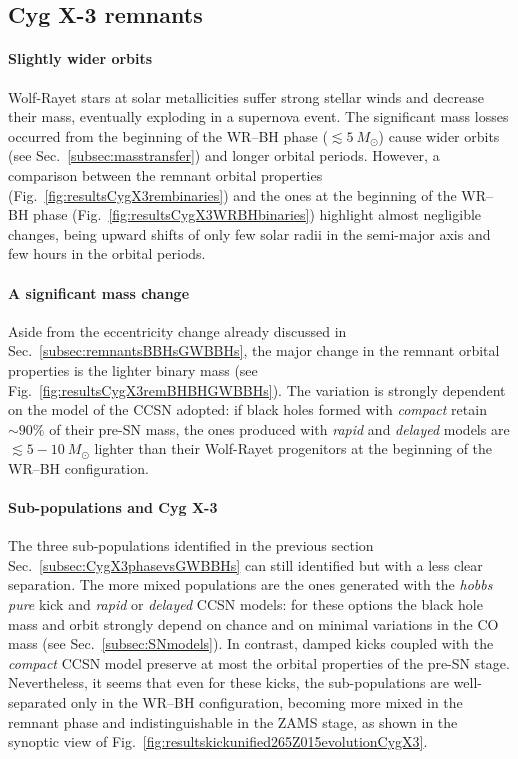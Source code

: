 \documentclass[a4paper,titlepage]{book}     	%
\newcommand{\sun}{\ensuremath{_\odot}}
\newcommand{\msun}{\ensuremath{M\sun}}
\begin{document}
\subsection{Cyg X-3 remnants}\label{subsec:RemnantsCygX3vsGWBBHs}
\paragraph{Slightly wider orbits} Wolf-Rayet stars at solar metallicities suffer strong stellar winds and decrease their mass, eventually exploding in a supernova event. The significant mass losses occurred from the beginning of the WR--BH phase ($\lesssim 5~\msun$) cause wider orbits (see Sec.\ \ref{subsec:masstransfer}) and longer orbital periods. However, a comparison between the remnant orbital properties (Fig.\ \ref{fig:resultsCygX3rembinaries}) and the ones at the beginning of the WR--BH phase (Fig.\ \ref{fig:resultsCygX3WRBHbinaries}) highlight almost negligible changes, being upward shifts of only few solar radii in the semi-major axis and few hours in the orbital periods. 

\paragraph{A significant mass change} Aside from the eccentricity change already discussed in Sec.\ \ref{subsec:remnantsBBHsGWBBHs}, the major change in the remnant orbital properties is the lighter binary mass (see Fig.\ \ref{fig:resultsCygX3remBHBHGWBBHs}). The variation is strongly dependent on the model of the CCSN adopted: if black holes formed with \emph{compact} retain $\sim 90\%$ of their pre-SN mass, the ones produced with \emph{rapid} and \emph{delayed} models are $\lesssim 5-10~\msun$ lighter than their Wolf-Rayet progenitors at the beginning of the WR--BH configuration.

\paragraph{Sub-populations and Cyg X-3} The three sub-populations identified in the previous section Sec.\ \ref{subsec:CygX3phasevsGWBBHs} can still identified but with a less clear separation. The more mixed populations are the ones generated with the \emph{hobbs pure} kick and \emph{rapid} or \emph{delayed} CCSN models: for these options the black hole mass and orbit strongly depend on chance and on minimal variations in the CO mass (see Sec.\ \ref{subsec:SNmodels}). In contrast, damped kicks coupled with the \emph{compact} CCSN model preserve at most the orbital properties of the pre-SN stage. Nevertheless, it seems that even for these kicks, the sub-populations are well-separated only in the WR--BH configuration, becoming more mixed in the remnant phase and indistinguishable in the ZAMS stage, as shown in the synoptic view of Fig.\ \ref{fig:resultskickunified265Z015evolutionCygX3}.
\end{document}
